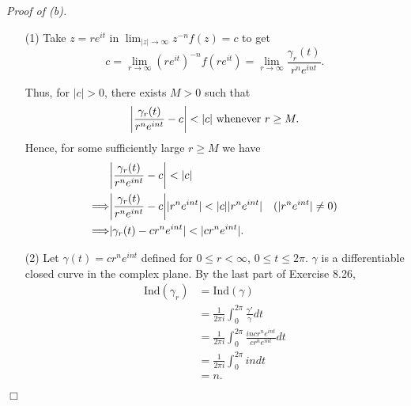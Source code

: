 \documentclass{article}
\begin{document}
\emph{Proof of (b).}
\begin{enumerate}
  \item[(1)]
  Take $z = re^{it}$ in $\lim_{|z| \to \infty} z^{-n} f(z) = c$
  to get
  \[
    c
    = \lim_{r \to \infty} (re^{it})^{-n} f(re^{it})
    = \lim_{r \to \infty} \frac{\gamma_r(t)}{r^n e^{int}}.
  \]

  Thus, for $|c| > 0$, there exists $M > 0$
  such that
  \[
    \abs{ \frac{\gamma_r(t)}{r^n e^{int}} - c } < |c|
    \text{ whenever } r \geq M.
  \]
  Hence, for some sufficiently large $r \geq M$ we have
  \begin{align*}
    &\abs{ \frac{\gamma_r(t)}{r^n e^{int}} - c } < |c| \\
    \Longrightarrow&
    \abs{ \frac{\gamma_r(t)}{r^n e^{int}} - c }|r^n e^{int}| < |c||r^n e^{int}|
      &(|r^n e^{int}| \neq 0) \\
    \Longrightarrow&
    | \gamma_r(t) - cr^n e^{int} | < |cr^n e^{int}|.
  \end{align*}

  \item[(2)]
  Let $\gamma(t) = cr^n e^{int}$ defined for $0 \leq r < \infty$, $0 \leq t \leq 2\pi$.
  $\gamma$ is a differentiable closed curve in the complex plane.
  By the last part of Exercise 8.26,
  \begin{align*}
    \mathrm{Ind}(\gamma_r)
    &= \mathrm{Ind}(\gamma) \\
    &= \frac{1}{2\pi i}\int_{0}^{2\pi} \frac{\gamma'}{\gamma} dt \\
    &= \frac{1}{2\pi i}\int_{0}^{2\pi} \frac{in cr^n e^{int}}{cr^n e^{int}} dt \\
    &= \frac{1}{2\pi i}\int_{0}^{2\pi} in dt \\
    &= n.
  \end{align*}
\end{enumerate}
$\Box$ \\
\end{document}
